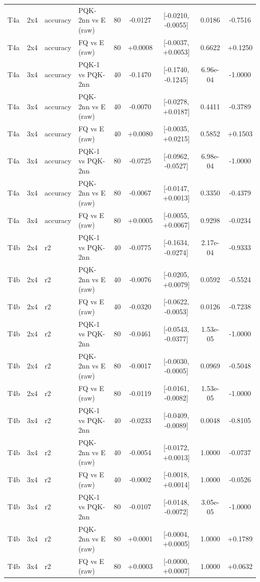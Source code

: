 \begin{table}[!t]
\begin{tabular}{@{}llllrcccc@{}}
T4a & 2x4 & accuracy & PQK-2nn vs E (raw) & 80 & -0.0127 & [-0.0210, -0.0055] & 0.0186 & -0.7516 \\
T4a & 2x4 & accuracy & FQ vs E (raw) & 80 & +0.0008 & [-0.0037, +0.0053] & 0.6622 & +0.1250 \\
T4a & 3x4 & accuracy & PQK-1 vs PQK-2nn & 40 & -0.1470 & [-0.1740, -0.1245] & 6.96e-04 & -1.0000 \\
T4a & 3x4 & accuracy & PQK-2nn vs E (raw) & 40 & -0.0070 & [-0.0278, +0.0187] & 0.4411 & -0.3789 \\
T4a & 3x4 & accuracy & FQ vs E (raw) & 40 & +0.0080 & [-0.0035, +0.0215] & 0.5852 & +0.1503 \\
T4a & 3x4 & accuracy & PQK-1 vs PQK-2nn & 80 & -0.0725 & [-0.0962, -0.0527] & 6.98e-04 & -1.0000 \\
T4a & 3x4 & accuracy & PQK-2nn vs E (raw) & 80 & -0.0067 & [-0.0147, +0.0013] & 0.3350 & -0.4379 \\
T4a & 3x4 & accuracy & FQ vs E (raw) & 80 & +0.0005 & [-0.0055, +0.0067] & 0.9298 & -0.0234 \\
T4b & 2x4 & r2 & PQK-1 vs PQK-2nn & 40 & -0.0775 & [-0.1634, -0.0274] & 2.17e-04 & -0.9333 \\
T4b & 2x4 & r2 & PQK-2nn vs E (raw) & 40 & -0.0076 & [-0.0205, +0.0079] & 0.0592 & -0.5524 \\
T4b & 2x4 & r2 & FQ vs E (raw) & 40 & -0.0320 & [-0.0622, -0.0053] & 0.0126 & -0.7238 \\
T4b & 2x4 & r2 & PQK-1 vs PQK-2nn & 80 & -0.0461 & [-0.0543, -0.0377] & 1.53e-05 & -1.0000 \\
T4b & 2x4 & r2 & PQK-2nn vs E (raw) & 80 & -0.0017 & [-0.0030, -0.0005] & 0.0969 & -0.5048 \\
T4b & 2x4 & r2 & FQ vs E (raw) & 80 & -0.0119 & [-0.0161, -0.0082] & 1.53e-05 & -1.0000 \\
T4b & 3x4 & r2 & PQK-1 vs PQK-2nn & 40 & -0.0233 & [-0.0409, -0.0089] & 0.0048 & -0.8105 \\
T4b & 3x4 & r2 & PQK-2nn vs E (raw) & 40 & -0.0054 & [-0.0172, +0.0013] & 1.0000 & -0.0737 \\
T4b & 3x4 & r2 & FQ vs E (raw) & 40 & -0.0002 & [-0.0018, +0.0014] & 1.0000 & -0.0526 \\
T4b & 3x4 & r2 & PQK-1 vs PQK-2nn & 80 & -0.0107 & [-0.0148, -0.0072] & 3.05e-05 & -1.0000 \\
T4b & 3x4 & r2 & PQK-2nn vs E (raw) & 80 & +0.0001 & [-0.0004, +0.0005] & 1.0000 & +0.1789 \\
T4b & 3x4 & r2 & FQ vs E (raw) & 80 & +0.0003 & [-0.0000, +0.0007] & 1.0000 & +0.0632 \\
\bottomrule
\end{tabular}
\end{table}
\endgroup
